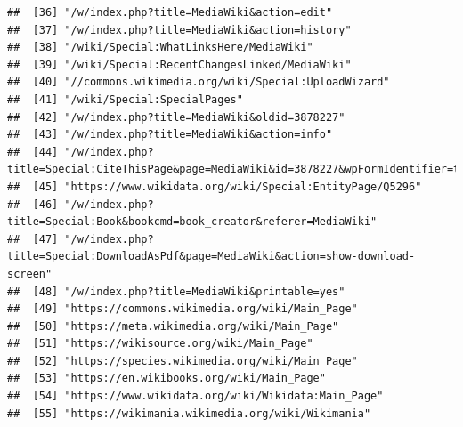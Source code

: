 \documentclass[
]{article}
\begin{document}
\begin{verbatim}
##  [36] "/w/index.php?title=MediaWiki&action=edit"                                                                                    
##  [37] "/w/index.php?title=MediaWiki&action=history"                                                                                 
##  [38] "/wiki/Special:WhatLinksHere/MediaWiki"                                                                                       
##  [39] "/wiki/Special:RecentChangesLinked/MediaWiki"                                                                                 
##  [40] "//commons.wikimedia.org/wiki/Special:UploadWizard"                                                                           
##  [41] "/wiki/Special:SpecialPages"                                                                                                  
##  [42] "/w/index.php?title=MediaWiki&oldid=3878227"                                                                                  
##  [43] "/w/index.php?title=MediaWiki&action=info"                                                                                    
##  [44] "/w/index.php?title=Special:CiteThisPage&page=MediaWiki&id=3878227&wpFormIdentifier=titleform"                                
##  [45] "https://www.wikidata.org/wiki/Special:EntityPage/Q5296"                                                                      
##  [46] "/w/index.php?title=Special:Book&bookcmd=book_creator&referer=MediaWiki"                                                      
##  [47] "/w/index.php?title=Special:DownloadAsPdf&page=MediaWiki&action=show-download-screen"                                         
##  [48] "/w/index.php?title=MediaWiki&printable=yes"                                                                                  
##  [49] "https://commons.wikimedia.org/wiki/Main_Page"                                                                                
##  [50] "https://meta.wikimedia.org/wiki/Main_Page"                                                                                   
##  [51] "https://wikisource.org/wiki/Main_Page"                                                                                       
##  [52] "https://species.wikimedia.org/wiki/Main_Page"                                                                                
##  [53] "https://en.wikibooks.org/wiki/Main_Page"                                                                                     
##  [54] "https://www.wikidata.org/wiki/Wikidata:Main_Page"                                                                            
##  [55] "https://wikimania.wikimedia.org/wiki/Wikimania"                                                                              

\end{verbatim}
\end{document}
